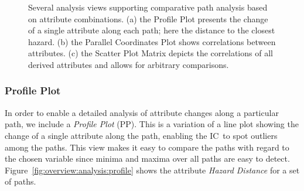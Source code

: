 \documentclass[conference,10pt,letter]{IEEEtran}
\def\IC{IC}
\begin{document}
\begin{figure}
	\centering
	\hfill
	\hfill
	\caption{Several analysis views supporting comparative path analysis based on attribute combinations. (a) the Profile Plot presents the change of a single attribute along each path; here the distance to the closest hazard. (b) the Parallel Coordinates Plot shows correlations between attributes. (c) the Scatter Plot Matrix depicts the correlations of all derived attributes and allows for arbitrary comparisons.}
\end{figure}

\subsubsection{Profile Plot} \label{sec:overview:analysis:profile}
In order to enable a detailed analysis of attribute changes along a particular path, we include a \emph{Profile Plot} (PP). This is a variation of a line plot showing the change of a single attribute along the path, enabling the \IC\ to spot outliers among the paths. This view makes it easy to compare the paths with regard to the chosen variable since minima and maxima over all paths are easy to detect. Figure~\ref{fig:overview:analysis:profile} shows the attribute \emph{Hazard Distance} for a set of paths.
\end{document}
